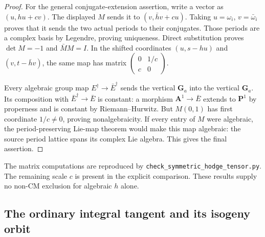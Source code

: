 \begin{proof}
For the general conjugate-extension assertion, write a vector as
$(u,hu+cv)$. The displayed $M$ sends it to
$(v,\bar h v+cu)$. Taking $u=\omega_i$, $v=\bar\omega_i$ proves
that it sends the two actual periods to their conjugates.
Those periods are a complex basis by Legendre, proving uniqueness.
Direct substitution proves $\det M=-1$ and $\bar M M=I$.
In the shifted coordinates $(u,s-hu)$ and $(v,t-\bar h v)$, the same
map has matrix
$\left(\begin{smallmatrix}0&1/c\\c&0\end{smallmatrix}\right)$.

Every algebraic group map $E^\dagger\to\bar E^\dagger$ sends the
vertical $\mathbf G_a$ into the vertical $\mathbf G_a$.
Its composition with $\bar E^\dagger\to\bar E$ is constant:
a morphism $\mathbf A^1\to\bar E$ extends to $\mathbf P^1$ by
properness and is constant by Riemann--Hurwitz. But $M(0,1)$ has
first coordinate $1/c\ne0$, proving nonalgebraicity.
If every entry of $M$ were algebraic, the period-preserving Lie-map
theorem \cite[Theorem 3.1, p.13 of the opened preprint]{EllBostCharles2016}
would make this map algebraic: the source period lattice spans its
complex Lie algebra. This gives the final assertion.
\end{proof}

The matrix computations are reproduced by
\texttt{check\_symmetric\_hodge\_tensor.py}. The remaining scale $c$
is present in the explicit comparison. These results supply no
non-CM exclusion for algebraic $h$ alone.


\subsection{The ordinary integral tangent and its isogeny orbit}

